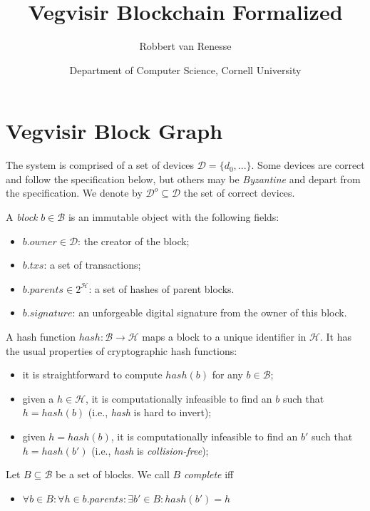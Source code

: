 \documentclass{article}
\title{Vegvisir Blockchain Formalized}
\author{Robbert van Renesse}
\date{Department of Computer Science, Cornell University}
\begin{document}
\maketitle

\section*{Vegvisir Block Graph}

The system is comprised of a set of devices $\mathcal{D} = \{ d_0, ... \}$.
Some devices are correct and follow the specification below,
but others may be \emph{Byzantine} and depart from the specification.  We denote by
$\mathcal{D}^o \subseteq \mathcal{D}$ the set of correct devices.

A \emph{block} $b \in \mathcal{B}$ is an immutable object with the following fields:
\begin{itemize}
\item $b.\mathit{owner} \in \mathcal{D}$: the creator of the block;
\item $b.\mathit{txs}$: a set of transactions;
\item $b.\mathit{parents} \in 2^\mathcal{H}$: a set of hashes of parent blocks.
\item $b.\mathit{signature}$: an unforgeable digital signature from the owner of this block.
\end{itemize}

A hash function $\mathit{hash}: \mathcal{B} \rightarrow \mathcal{H}$ maps a block to a unique
identifier in $\mathcal{H}$.  It has the usual properties of cryptographic hash functions:
\begin{itemize}
\item it is straightforward to compute $\mathit{hash}(b)$ for any $b \in \mathcal{B}$;
\item given a $h \in \mathcal{H}$, it is computationally infeasible to find an $b$ such that $h = \mathit{hash}(b)$ (i.e., \textit{hash} is hard to invert);
\item given $h = \mathit{hash}(b)$, it is computationally infeasible to find an $b'$ such that $h = \mathit{hash}(b')$ (i.e., \textit{hash} is \emph{collision-free});
\end{itemize}

Let $B \subseteq \mathcal{B}$ be a set of blocks.  We call $B$ \emph{complete} iff
\begin{itemize}
\item $\forall b \in B: \forall h \in b.\mathit{parents}: \exists b' \in B: \mathit{hash}(b') = h$
\end{itemize}
\end{document}
